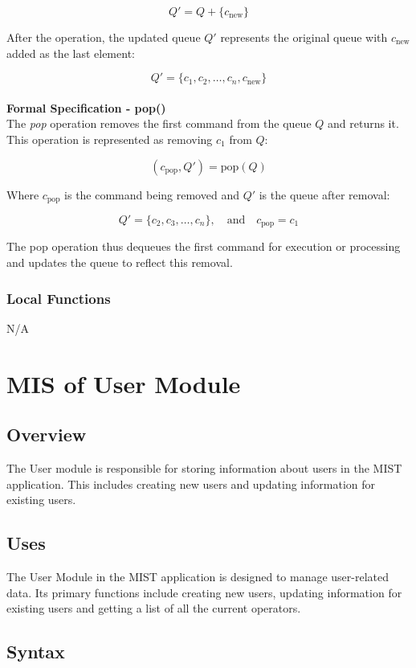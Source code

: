 \documentclass[12pt, titlepage]{article}
\begin{document}
\[
Q' = Q + \{c_{\text{new}}\}
\]

After the operation, the updated queue $Q'$ represents the original queue with $c_{\text{new}}$ added as the last element:

\[
Q' = \{c_1, c_2, \ldots, c_n, c_{\text{new}}\}
\]
\\
\textbf{Formal Specification - pop()}\\
The \textit{pop} operation removes the first command from the queue $Q$ and returns it. This operation is represented as removing $c_1$ from $Q$:

\[
(c_{\text{pop}}, Q') = \text{pop}(Q)
\]

Where $c_{\text{pop}}$ is the command being removed and $Q'$ is the queue after removal:

\[
Q' = \{c_2, c_3, \ldots, c_n\}, \quad \text{and} \quad c_{\text{pop}} = c_1
\]

The pop operation thus dequeues the first command for execution or processing and updates the queue to reflect this removal.


\subsubsection{Local Functions}
N/A



\section{MIS of User Module} \label{Module} 


\subsection{Overview}
The User module is responsible for storing information about users in the MIST application. This includes creating new users and updating information for existing users.

\subsection{Uses}
The User Module in the MIST application is designed to manage user-related data. Its primary functions include creating new users, updating information for existing users and getting a list of all the current operators.

\subsection{Syntax}
\end{document}
